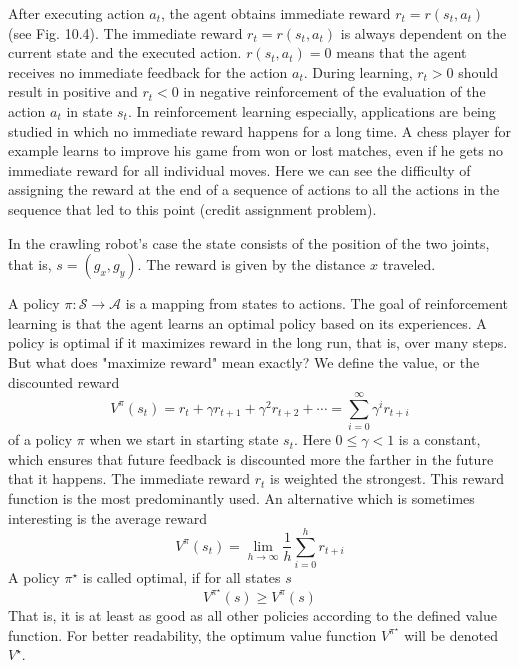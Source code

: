 \documentclass[10pt]{book}
\begin{document}
After executing action $a_{t}$, the agent obtains immediate reward $r_{t}=r\left(s_{t}, a_{t}\right)$ (see Fig. 10.4). The immediate reward $r_{t}=r\left(s_{t}, a_{t}\right)$ is always dependent on the current state and the executed action. $r\left(s_{t}, a_{t}\right)=0$ means that the agent receives no immediate feedback for the action $a_{t}$. During learning, $r_{t}>0$ should result in positive and $r_{t}<0$ in negative reinforcement of the evaluation of the action $a_{t}$ in state $s_{t}$. In reinforcement learning especially, applications are being studied in which no immediate reward happens for a long time. A chess player for example learns to improve his game from won or lost matches, even if he gets no immediate reward for all individual moves. Here we can see the difficulty of assigning the reward at the end of a sequence of actions to all the actions in the sequence that led to this point (credit assignment problem).

In the crawling robot's case the state consists of the position of the two joints, that is, $s=\left(g_{x}, g_{y}\right)$. The reward is given by the distance $x$ traveled.

A policy $\pi: \mathcal{S} \rightarrow \mathcal{A}$ is a mapping from states to actions. The goal of reinforcement learning is that the agent learns an optimal policy based on its experiences. A policy is optimal if it maximizes reward in the long run, that is, over many steps. But what does "maximize reward" mean exactly? We define the value, or the discounted reward
\begin{equation*}
V^{\pi}\left(s_{t}\right)=r_{t}+\gamma r_{t+1}+\gamma^{2} r_{t+2}+\cdots=\sum_{i=0}^{\infty} \gamma^{i} r_{t+i}
\end{equation*}
of a policy $\pi$ when we start in starting state $s_{t}$. Here $0 \leq \gamma<1$ is a constant, which ensures that future feedback is discounted more the farther in the future that it happens. The immediate reward $r_{t}$ is weighted the strongest. This reward function is the most predominantly used. An alternative which is sometimes interesting is the average reward
\begin{equation*}
V^{\pi}\left(s_{t}\right)=\lim _{h \rightarrow \infty} \frac{1}{h} \sum_{i=0}^{h} r_{t+i}
\end{equation*}
A policy $\pi^{\star}$ is called optimal, if for all states $s$
\begin{equation*}
V^{\pi^{\star}}(s) \geq V^{\pi}(s)
\end{equation*}
That is, it is at least as good as all other policies according to the defined value function. For better readability, the optimum value function $V^{\pi^{\star}}$ will be denoted $V^{\star}$.
\end{document}
